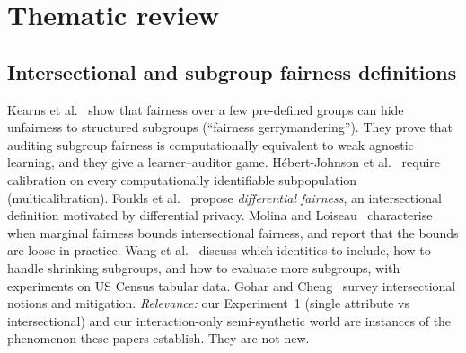 \documentclass[10pt]{article}
\begin{document}
\section{Thematic review}
\subsection{Intersectional and subgroup fairness definitions}
Kearns et al.~\cite{kearns2018} show that fairness over a few pre-defined groups can hide unfairness to structured
subgroups (``fairness gerrymandering''). They prove that auditing subgroup fairness is computationally equivalent to weak
agnostic learning, and they give a learner--auditor game. H\'ebert-Johnson et al.~\cite{hebert2018} require calibration on
every computationally identifiable subpopulation (multicalibration). Foulds et al.~\cite{foulds2020icde} propose
\emph{differential fairness}, an intersectional definition motivated by differential privacy. Molina and
Loiseau~\cite{molina2022} characterise when marginal fairness bounds intersectional fairness, and report that the bounds
are loose in practice. Wang et al.~\cite{wang2022} discuss which identities to include, how to handle shrinking
subgroups, and how to evaluate more subgroups, with experiments on US Census tabular data. Gohar and Cheng~\cite{gohar2023}
survey intersectional notions and mitigation. \emph{Relevance:} our Experiment~1 (single attribute vs intersectional) and
our interaction-only semi-synthetic world are instances of the phenomenon these papers establish. They are not new.
\end{document}
